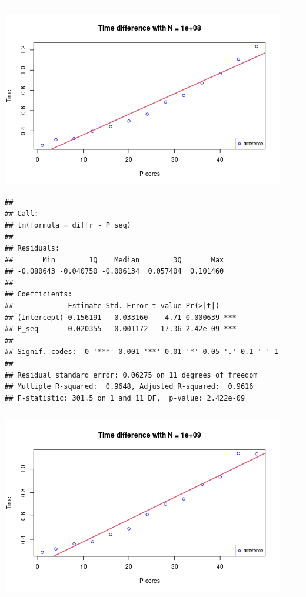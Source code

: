 \documentclass[
  10pt,
]{article}
\begin{document}
\begin{center}\rule{0.5\linewidth}{0.5pt}\end{center}

\begin{center}\includegraphics{figs/ws_overhead-1} \end{center}

\begin{verbatim}
## 
## Call:
## lm(formula = diffr ~ P_seq)
## 
## Residuals:
##       Min        1Q    Median        3Q       Max 
## -0.080643 -0.040750 -0.006134  0.057404  0.101460 
## 
## Coefficients:
##             Estimate Std. Error t value Pr(>|t|)    
## (Intercept) 0.156191   0.033160    4.71 0.000639 ***
## P_seq       0.020355   0.001172   17.36 2.42e-09 ***
## ---
## Signif. codes:  0 '***' 0.001 '**' 0.01 '*' 0.05 '.' 0.1 ' ' 1
## 
## Residual standard error: 0.06275 on 11 degrees of freedom
## Multiple R-squared:  0.9648, Adjusted R-squared:  0.9616 
## F-statistic: 301.5 on 1 and 11 DF,  p-value: 2.422e-09
\end{verbatim}

\begin{center}\rule{0.5\linewidth}{0.5pt}\end{center}

\begin{center}\includegraphics{figs/ws_overhead-2} \end{center}
\end{document}
